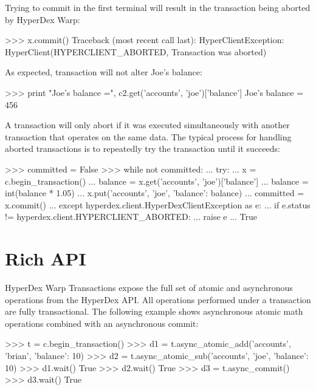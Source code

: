 Trying to commit  in the first terminal will result in the transaction
being aborted by HyperDex Warp:

\begin{pyconcode}
>>> x.commit()
Traceback (most recent call last):
HyperClientException: HyperClient(HYPERCLIENT_ABORTED, Transaction was aborted)
\end{pyconcode}

As expected, transaction  will not alter Joe's balance:

\begin{pyconcode}
>>> print "Joe's balance =", c2.get('accounts', 'joe')['balance']
Joe's balance = 456
\end{pyconcode}

A transaction will only abort if it was executed simultaneously with another
transaction that operates on the same data.  The typical process for handling
aborted transactions is to repeatedly try the transaction until it succeeds:

\begin{pyconcode}
>>> committed = False
>>> while not committed:
...     try:
...         x = c.begin_transaction()
...         balance = x.get('accounts', 'joe')['balance']
...         balance = int(balance * 1.05)
...         x.put('accounts', 'joe', {'balance': balance})
...         committed = x.commit()
...     except hyperdex.client.HyperDexClientException as e:
...         if e.status != hyperdex.client.HYPERCLIENT_ABORTED:
...             raise e
...
True
\end{pyconcode}

\section{Rich API}
\label{sec:transactions:API}

HyperDex Warp Transactions expose the full set of atomic and asynchronous
operations from the HyperDex API.  All operations performed under a transaction
are fully transactional.  The following example shows asynchronous atomic math
operations combined with an asynchronous commit:

\begin{pyconcode}
>>> t = c.begin_transaction()
>>> d1 = t.async_atomic_add('accounts', 'brian', {'balance': 10})
>>> d2 = t.async_atomic_sub('accounts', 'joe', {'balance': 10})
>>> d1.wait()
True
>>> d2.wait()
True
>>> d3 = t.async_commit()
>>> d3.wait()
True
\end{pyconcode}

